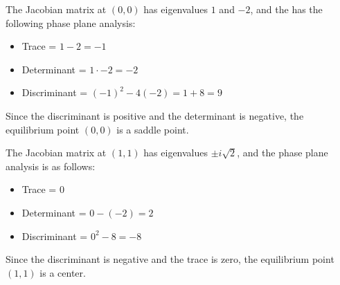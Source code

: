 \documentclass[10pt]{beamer}
\begin{document}
\begin{frame}
    The Jacobian matrix at $(0, 0)$ has eigenvalues $1$ and $-2$, and the has the
    following phase plane analysis:
    \begin{itemize}
        \item Trace = $1 - 2 = -1$
        \item Determinant = $1 \cdot -2 = -2$
        \item Discriminant = $(-1)^2 - 4(-2) = 1 + 8 = 9$
    \end{itemize}

    Since the discriminant is positive and the determinant is negative, the
    equilibrium point $(0, 0)$ is a saddle point.
\end{frame}

\begin{frame}
    The Jacobian matrix at $(1, 1)$ has eigenvalues $\pm i\sqrt{2}$, and the phase
    plane analysis is as follows:
    \begin{itemize}
        \item Trace = $0$
        \item Determinant = $0 - (-2) = 2$
        \item Discriminant = $0^2 - 8 = -8$
    \end{itemize}

    Since the discriminant is negative and the trace is zero, the equilibrium point
    $(1, 1)$ is a center.

\end{frame}
\end{document}
